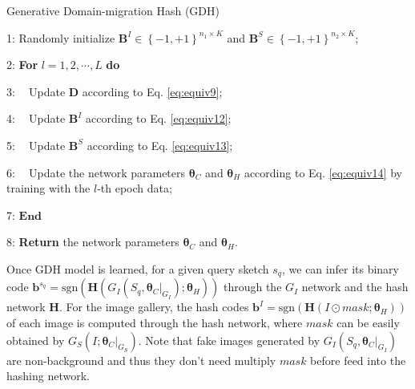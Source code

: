 \documentclass[runningheads]{llncs}
\newcommand{\sgn}{{\mathrm{sgn}}}
\begin{document}
\begin{algorithm}
\small
       \caption{Generative Domain-migration Hash (GDH)}
       \label{alg:GDH}
        1: Randomly initialize $\mathbf{B}^I\in\left \{ -1,+1 \right \}^{n_1 \times K}$ and $\mathbf{B}^S \in\left \{ -1,+1 \right \}^{n_2 \times K}$;
        
        2: \textbf{For} $l = 1, 2, \cdots, L$ \textbf{do}

        3: $\;\;$ Update $\mathbf{D}$ according to Eq. \eqref{eq:equiv9};

        4:  $\;\;$ Update $\mathbf{B}^I$ according to Eq. \eqref{eq:equiv12};

        5:  $\;\;$ Update $\mathbf{B}^S$ according to Eq. \eqref{eq:equiv13};

        6:  $\;\;$ Update the network parameters $\bm{\theta}_C$ and $\bm{\theta}_H$ according to Eq. \eqref{eq:equiv14} by training with the $l$-th epoch data;

        7: $\textbf{End}$
        
        8: \textbf{Return} the network parameters $\bm{\theta}_C$ and $\bm{\theta}_H$.
      \label{alg:a1}
\end{algorithm}


Once GDH model is learned, for a given query sketch $s_q$, we can infer its binary code $\mathbf{b}^{s_q} = \sgn\left (\mathbf{H}\left ( G_I\left ( S_q, \bm{\theta}_C|_{G_I} \right );\bm{\theta}_H  \right )\right)$ through the $G_I$ network and the hash network $\mathbf{H}$. For the image gallery, the hash codes $\mathbf{b}^I = \sgn\left(\mathbf{H}\left( I \odot mask ;\bm{\theta}_H\right )\right)$ of each image is computed through the hash network, where $mask$ can be easily obtained by $G_S\left(I;\bm{\theta}_C|_{G_S}\right)$. Note that fake images generated by $G_I\left ( S_q, \bm{\theta}_C|_{G_I} \right )$ are non-background and thus they don't need multiply $mask$ before feed into the hashing network.
\end{document}
